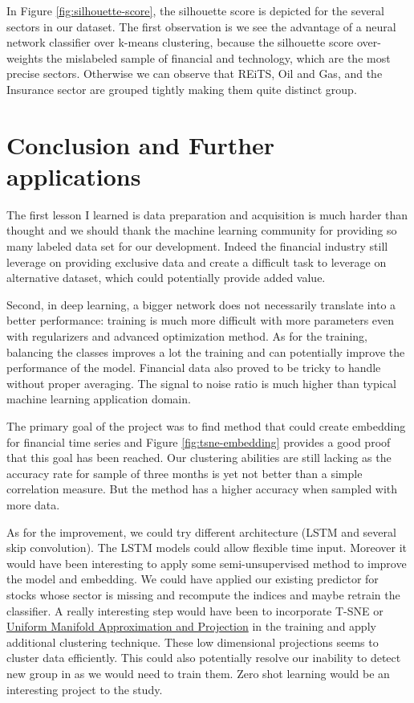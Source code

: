 \documentclass[a4paper,twoside]{article}
\begin{document}
In Figure \ref{fig:silhouette-score}, the silhouette score is depicted for the
several sectors in our dataset. The first observation is we see the advantage
of a neural network classifier over k-means clustering, because the silhouette
score over-weights the mislabeled sample of financial and technology, which are
the most precise sectors. Otherwise we can observe that REiTS, Oil and Gas,
and the Insurance sector are grouped tightly making them quite distinct group.


\section{Conclusion and Further applications}
\label{sec:org57b47c5}

The first lesson I learned is data preparation and acquisition is much harder
than thought and we should thank the machine learning community for providing
so many labeled data set for our development. Indeed the financial industry
still leverage on providing exclusive data and create a difficult task to
leverage on alternative dataset, which could potentially provide added value.

Second, in deep learning, a bigger network does not necessarily translate into
a better performance: training is much more difficult with more parameters
even with regularizers and advanced optimization method. As for the training,
balancing the classes improves a lot the training and can potentially improve
the performance of the model. Financial data also proved to be tricky to
handle without proper averaging. The signal to noise ratio is much higher than
typical machine learning application domain.

The primary goal of the project was to find method that could create embedding
for financial time series and Figure \ref{fig:tsne-embedding} provides a good
proof that this goal has been reached. Our clustering abilities are still
lacking as the accuracy rate for sample of three months is yet not better than
a simple correlation measure. But the method has a higher accuracy when
sampled with more data. 

As for the improvement, we could try different architecture (LSTM and several
skip convolution). The LSTM models could allow flexible time input. Moreover
it would have been interesting to apply some semi-unsupervised method to
improve the model and embedding. We could have applied our existing predictor
for stocks whose sector is missing and recompute the indices and maybe retrain
the classifier. A really interesting step would have been to incorporate T-SNE
or \href{https://github.com/lmcinnes/umap}{Uniform Manifold Approximation and Projection} in the training and apply
additional clustering technique. These low dimensional projections seems to
cluster data efficiently. This could also potentially resolve our inability to
detect new group in as we would need to train them. Zero shot learning would
be an interesting project to the study.
\end{document}
